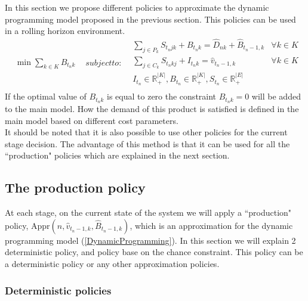 \documentclass[10pt]{article}
\newcommand{\ti}{t} %
\newcommand{\ka}{k} %
\newcommand{\KA}{K}
\newcommand{\jey}{j} %
\begin{document}
In this section we propose different policies to approximate the dynamic programming model proposed in the previous section. This policies can be used in a rolling horizon environment.
\begin{subequations}
\label{Currentstage}

\begin{flalign}
&\min  \sum_{k \in K}  {B}_{ t_n \ka} & \label{eq:Current_obj} 
\end{flalign}
 subject to:
\begin{flalign}
  &  \sum_{j\in P_{k}} {S}_{\ti_n  \jey \ka} + B_{t_n \ka}  = \hat{D}_{n \ka} + \hat{B}_{t_n-1, \ka} &\forall k \in K  &     \label{eq:Current_inventory_tn}&\\
&  \sum_{j\in C_{k}} {S}_{\ti_n \ka \jey} + I_{ t_n \ka} = \hat{v}_{t_n-1 , \ka} &\forall k \in K  &     \label{eq:Current_Orderup}&\\
& {I}_{ \ti_n } \in \mathbb{R}_{+}^{|\KA|} , {B}_{ \ti_n } \in \mathbb{R}_{+}^{|\KA|} , {S}_{\ti_n} \in \mathbb{R}_{+}^{|E|} &    & \label{eq:Sub_FD_bound2}\\
 \label{eq:Sub_FD_bound3}
\end{flalign}
\end{subequations}
If the optimal value of  $B_{ t_n \ka}$  is equal to zero the constraint $B_{ t_n \ka} = 0$ will be added to the main model. How the demand of this product is satisfied is defined in the main model based on different cost parameters.\\
It should be noted that it is also possible to use other policies for the current stage decision. The advantage of this method is that it can be used for all the ``production" policies which are explained in the next section.

\subsection{The production policy}
At each stage, on the current state of the system we will apply a ``production" policy, Appr$(n,\hat{v}_{t_n-1 ,k}, \hat{B}_{t_n-1 , \ka})$, which is an approximation for the dynamic programming model (\ref{DynamicProgramming}). In this section we will explain 2 deterministic policy, and policy base on the chance constraint. This policy can be a deterministic policy or any other approximation policies. 
 
\subsubsection{Deterministic policies}
\end{document}
